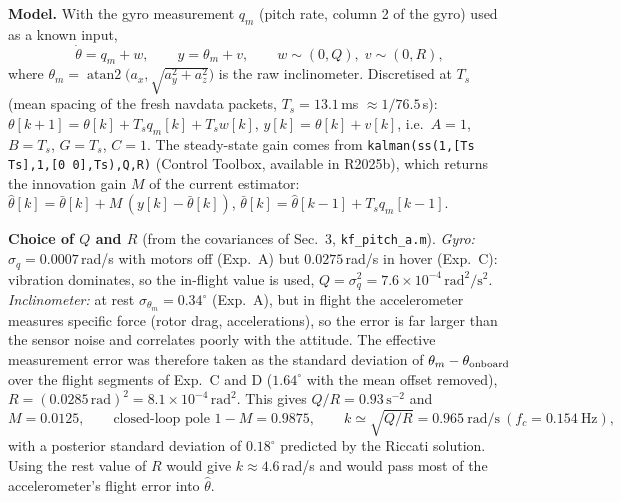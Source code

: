 \textbf{Model.} With the gyro measurement $q_m$ (pitch rate, column 2 of the gyro) used as a known input,
\begin{equation}
\dot\theta = q_m + w,\qquad y = \theta_m + v,\qquad w\sim(0,Q),\; v\sim(0,R),
\end{equation}
where $\theta_m=\operatorname{atan2}\!\big(a_x,\sqrt{a_y^2+a_z^2}\big)$ is the raw inclinometer. Discretised at $T_s$ (mean spacing of the
fresh navdata packets, $T_s=13.1$\,ms $\approx 1/76.5$\,s):
$\theta[k{+}1]=\theta[k]+T_s q_m[k]+T_s w[k]$, $y[k]=\theta[k]+v[k]$, i.e.\ $A=1$, $B=T_s$, $G=T_s$, $C=1$.
The steady-state gain comes from \texttt{kalman(ss(1,[Ts Ts],1,[0 0],Ts),Q,R)}
(Control Toolbox, available in R2025b), which returns the innovation gain $M$ of the current estimator:
$\hat\theta[k]=\bar\theta[k]+M\,(y[k]-\bar\theta[k])$, $\bar\theta[k]=\hat\theta[k{-}1]+T_s q_m[k{-}1]$.

\textbf{Choice of $Q$ and $R$} (from the covariances of Sec.~3, \texttt{kf\_pitch\_a.m}).
\emph{Gyro:} $\sigma_q = 0.0007$\,rad/s with motors off (Exp.~A) but $0.0275$\,rad/s in hover (Exp.~C): vibration dominates,
so the in-flight value is used, $Q=\sigma_q^2=7.6\times10^{-4}\,\text{rad}^2/\text{s}^2$.
\emph{Inclinometer:} at rest $\sigma_{\theta_m}=0.34^\circ$ (Exp.~A), but in flight the accelerometer measures specific force
(rotor drag, accelerations), so the error is far larger than the sensor noise and correlates poorly with the attitude. The effective
measurement error was therefore taken as the standard deviation of $\theta_m-\theta_{\rm onboard}$ over the flight segments of Exp.~C and D
($1.64^\circ$ with the mean offset removed), $R=(0.0285\,\text{rad})^2=8.1\times10^{-4}\,\text{rad}^2$. This gives $Q/R=0.93\,\mathrm{s^{-2}}$ and
\begin{equation}
M=0.0125,\qquad \text{closed-loop pole } 1-M=0.9875,\qquad k\simeq\sqrt{Q/R}=0.965\ \text{rad/s}\ (f_c=0.154\ \text{Hz}),
\end{equation}
with a posterior standard deviation of $0.18^\circ$ predicted by the Riccati solution. Using the rest value of $R$ would give $k\approx 4.6$\,rad/s and would
pass most of the accelerometer's flight error into $\hat\theta$.

